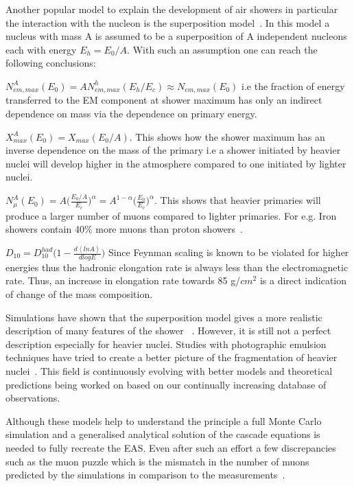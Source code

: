 Another popular model to explain the development of air showers in particular the interaction with the nucleon is the superposition model~\cite{}. In this model a nucleus with mass A is assumed to be a superposition of A independent nucleons each with energy $E_h = E_0/A$. With such an assumption one can reach the following conclusions:

\begin{description}
    \item $N_{em,max}^A(E_0) = A N_{em,max}^h(E_h/E_c) \approx N_{em,max}(E_0) $ i.e the fraction of energy transferred to the EM component at shower maximum has only an indirect dependence on mass via the dependence on primary energy.
    \item $X_{max}^A(E_0) = X_{max}(E_0/A)$. This shows how the shower maximum has an inverse dependence on the mass of the primary i.e a shower initiated by heavier nuclei will develop higher in the atmosphere compared to one initiated by lighter nuclei.
    \item $N_{\mu}^A(E_0) =  A \biggl(\frac{E_0/A}{E_{c}}\biggr)^{\alpha} = A^{1-\alpha} \biggl(\frac{E_0}{E_c}\biggr)^{\alpha}$. This shows that heavier primaries will produce a larger number of muons compared to lighter primaries. For e.g. Iron showers contain 40\% more muons than proton showers~\cite{}.
    \item $D_{10} = D_{10}^{had} \Biggl(1- \frac{d\left\langle ln A\right\rangle}{dlogE}\Biggr)$ Since Feynman scaling is known to be violated for higher energies thus the hadronic elongation rate is always less than the electromagnetic rate. Thus, an increase in elongation rate towards 85 g/$cm^2$ is a direct indication of change of the mass composition. 
\end{description}
Simulations have shown that the superposition model gives a more realistic description of many features of the shower ~\cite{}. However, it is still not a perfect description especially for heavier nuclei. Studies with photographic emulsion techniques have tried to create a better picture of the fragmentation of heavier nuclei~\cite{}. This field is continuously evolving with better models and theoretical predictions being worked on based on our continually increasing database of observations. 

Although these models help to understand the principle a full Monte Carlo simulation and a generalised analytical solution of the cascade equations is needed to fully recreate the EAS. Even after such an effort a few discrepancies such as the muon puzzle which is the mismatch in the number of muons predicted by the simulations in comparison to the measurements~\cite{}.  

